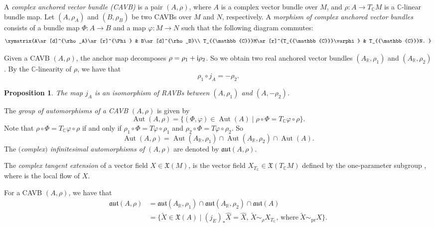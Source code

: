\documentclass[pdftex]{sigma}
\numberwithin{equation}{section}
\newtheorem{Proposition}[Theorem]{Proposition}
 { \theoremstyle{definition}
\newtheorem{Definition}[Theorem]{Definition}
\newtheorem{Note}[Theorem]{Note}
\newtheorem{Example}[Theorem]{Example}
\newtheorem{Examples}[Theorem]{Examples}
\newtheorem{Remark}[Theorem]{Remark} }
\newcommand{\R}{{\mathbb{R}}}
\newcommand{\C}{{\mathbb{C}}}
\newcommand{\X}{\mathfrak{X}}
\newcommand{\aut}{\mathfrak{aut}}
\DeclareMathOperator{\Aut}{Aut}
\DeclareMathOperator{\pr}{pr}
\begin{document}
\begin{Definition}
 A {\em complex anchored vector bundle (CAVB)} is a pair $(A,\rho)$, where $A$ is a complex vector bundle over $M$, and $\rho\colon A\to T_{\C}M$ is a $\C$-linear bundle map. Let $(A,\rho_A)$ and $(B,\rho_B)$ be two CAVBs over $M$ and $N$, respectively. A {\em morphism of complex anchored vector bundles} consists of a bundle map $\Phi\colon A\to B$ and a map $\varphi\colon M\to N$ such that the following diagram commutes:
\[\xymatrix{A\ar[d]^{\rho_A}\ar[r]^{\Phi} & B\ar[d]^{\rho_B}\\ T_{\C}M\ar[r]^{T_{\C}\varphi} & T_{\C}N.
}\]

\end{Definition}
Given a CAVB $(A, \rho)$, the anchor map decomposes $\rho=\rho_1+{\rm i}\rho_2$. So we obtain two real anchored vector bundles $(A_{\R},\rho_1)$ and $(A_{\R}, \rho_2)$. By the $\C$-linearity of $\rho$, we have that
\[\rho_1 \circ j_A=-\rho_2.\]
\begin{Proposition}
The map $j_A$ is an isomorphism of RAVBs between $(A, \rho_1)$ and $(A,-\rho_2)$.
\end{Proposition}
 The {\em group of automorphisms of a CAVB} $(A,\rho)$ is given by
 \[\Aut(A,\rho)=\{(\Phi, \varphi)\in \Aut(A)\mid \rho\circ\Phi=T_{\C}\varphi\circ \rho\}.\]
 Note that $\rho\circ\Phi=T_{\C}\varphi\circ \rho$ if and only if $\rho_1\circ \Phi=T\varphi\circ \rho_1$ and $\rho_2\circ \Phi=T\varphi\circ \rho_2$. So
 \[\Aut(A,\rho)=\Aut(A_{\R},\rho_1)\cap \Aut(A_{\R},\rho_2)\cap \Aut (A).\]
 The {\em $($complex$)$ infinitesimal automorphisms of $(A,\rho)$} are denoted by $\aut(A,\rho)$.
\begin{Definition}\label{cx_tangent_extension}
   The {\em complex tangent extension} of a vector field $X\in \X(M)$, is the vector field $X_{T_{\C}}\in \mathfrak{X}(T_{\C}M)$ defined by the one-parameter subgroup \smash{$T_{\C}\varphi_t ^{X}$}, where  is the local flow of $X$.
\end{Definition}

For a CAVB $(A,\rho)$, we have that
\begin{align*}
\mathfrak{aut}(A,\rho)&{}=\aut(A_{\R},\rho_1)\cap \aut(A_{\R},\rho_2)\cap \aut(A)\\
&{}=\bigl\{\widetilde{X}\in \X(A)\mid (j_E)_* \hat{X}=\hat{X},\, \widetilde{X}\sim_{\rho} X_{T_{\C}},\, \text{where}\ \widetilde{X}\sim_{\pr} X\bigr\}.
\end{align*}
\end{document}
